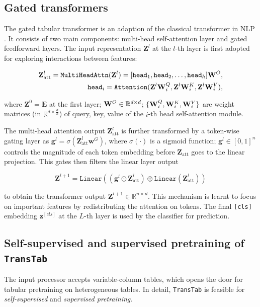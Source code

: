 \subsection{Gated transformers} The gated tabular transformer is an adaption of the classical transformer in NLP \cite{vaswani2017attention}. It consists of two main components: multi-head self-attention layer and gated feedforward layers. The input representation ${\mathbf{Z}}^l$ at the $l$-th layer is first adopted for exploring interactions between features:

\begin{align}
   {\mathbf{Z}}^l_{\text{att}} = \texttt{MultiHeadAttn}({\mathbf{Z}}^l) = [\texttt{head}_1,\texttt{head}_2,\dots,\texttt{head}_h]{\rm \mathbf{W}}^O, \\
    \texttt{head}_i = \texttt{Attention}({\mathbf{Z}}^l{\rm \mathbf{W}}^Q_i, {\mathbf{Z}}^l{\rm \mathbf{W}}^K_i, {\mathbf{Z}}^l{\rm \mathbf{W}}^V_i), \label{eq:attention_head}
\end{align}

where ${\mathbf{Z}}^0 = {\mathbf{E}}$ at the first layer; ${\rm \mathbf{W}}^O \in \mathbb{R}^{d\times d}$; $\{{\rm \mathbf{W}}^Q_i,{\rm \mathbf{W}}^K_i,{\rm \mathbf{W}}^V_i\}$ are weight matrices (in $\mathbb{R}^{d\times \frac{d}{h}}$) of query, key, value of the $i$-th head self-attention module.

The multi-head attention output ${\mathbf{Z}}^l_{\text{att}}$ is further transformed by a token-wise gating layer as $\mathbf{g}^l = \sigma({\mathbf{Z}}_{\text{att}}^l \mathbf{w}^G)$, where $\sigma(\cdot)$ is a sigmoid function; $\mathbf{g}^l \in [0,1]^n$ controls the magnitude of each token embedding before ${\mathbf{Z}}_{\text{att}}$ goes to the linear projection. This gates then filters the linear layer output

\begin{equation}
    {\mathbf{Z}}^{l+1} = \texttt{Linear}\left((\mathbf{g}^l \odot {\mathbf{Z}}^l_{\text{att}})\oplus \texttt{Linear}({\mathbf{Z}}_{\text{att}}^l) \right)
\end{equation}

to obtain the transformer output ${\mathbf{Z}}^{l+1} \in \mathbb{R}^{n\times d}$. This mechanism is learnt to focus on important features by redistributing the attention on tokens. The final \texttt{[cls]} embedding $\mathbf{z}^{[cls]}$ at the $L$-th layer is used by the classifier for prediction.

\subsection{Self-supervised and supervised pretraining of \texttt{TransTab}}
The input processor accepts variable-column tables, which opens the door for tabular pretraining on heterogeneous tables. In detail, \texttt{TransTab} is feasible for \textit{self-supervised} and \textit{supervised pretraining}.


